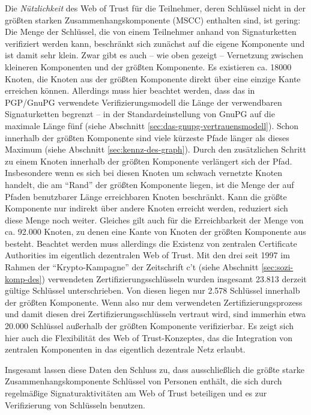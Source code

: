 Die \emph{Nützlichkeit} des Web of Trust für die Teilnehmer, deren
Schlüssel nicht in der größten starken Zusammenhangskomponente
(MSCC)
enthalten sind, ist gering: Die Menge der Schlüssel, die von einem
Teilnehmer anhand von Signaturketten verifiziert werden kann,
beschränkt sich zunächst auf die eigene Komponente und ist damit
sehr klein. Zwar gibt es auch -- wie oben gezeigt -- Vernetzung
zwischen kleineren Komponenten und der größten Komponente. Es
existieren ca. 18000 Knoten, die Knoten aus der größten Komponente
direkt über eine einzige Kante erreichen können. Allerdings muss
hier beachtet werden, dass das in PGP/GnuPG verwendete
Verifizierungsmodell die Länge der verwendbaren Signaturketten
begrenzt -- in der Standardeinstellung von GnuPG auf die maximale
Länge fünf (siehe Abschnitt
\ref{sec:das-gnupg-vertrauensmodell}). Schon innerhalb der größten
Komponente sind viele kürzeste Pfade länger als dieses Maximum
(siehe Abschnitt \ref{sec:kennz-des-graph}). Durch den zusätzlichen
Schritt zu einem Knoten innerhalb der größten Komponente
verlängert sich der Pfad. Insbesondere wenn es sich bei diesen
Knoten um schwach vernetzte Knoten handelt, die am ``Rand'' der
größten Komponente liegen, ist die Menge der auf Pfaden benutzbarer
Länge erreichbaren Knoten beschränkt. Kann die größte
Komponente nur indirekt über andere Knoten erreicht werden,
reduziert sich diese Menge noch weiter. Gleiches gilt auch für die
Erreichbarkeit der Menge von ca. 92.000 Knoten, zu denen eine Kante von
Knoten der größten Komponente aus besteht. Beachtet werden muss
allerdings die Existenz von zentralen Certificate Authorities im
eigentlich dezentralen Web of Trust. Mit den drei seit 1997 im Rahmen
der ``Krypto-Kampagne'' der Zeitschrift c't (siehe Abschnitt
\ref{sec:sozi-komp-des}) verwendeten Zertifizierungsschlüsseln
wurden insgesamt 23.813 derzeit gültige Schlüssel
unterschrieben. Von diesen liegen nur 2.578 Schlüssel innerhalb der
größten Komponente. Wenn also nur dem verwendeten
Zertifizierungsprozess und damit diesen drei
Zertifizierungsschlüsseln vertraut wird, sind immerhin etwa 20.000
Schlüssel außerhalb der größten Komponente verifizierbar. Es
zeigt sich hier auch die Flexibilität des Web of Trust-Konzeptes,
das die Integration von zentralen Komponenten in das eigentlich
dezentrale Netz erlaubt.

Insgesamt lassen diese Daten den Schluss zu, dass ausschließlich die
größte starke Zusammenhangskomponente Schlüssel von Personen
enthält, die sich durch regelmäßige Signaturaktivitäten am Web
of Trust beteiligen und es zur Verifizierung von Schlüsseln
benutzen. 

